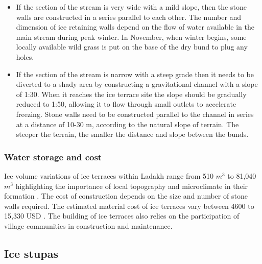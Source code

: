 \begin{itemize}

  \item If the section of the stream is very wide with a mild slope, then the stone walls are
    constructed in a series parallel to each other. The number and dimension of ice retaining walls depend on
    the flow of water available in the main stream during peak winter. In November, when winter begins, some
    locally available wild grass is put on the base of the dry bund to plug any holes.

  \item If the section of the stream is narrow with a steep grade then it needs to be diverted to a shady area
    by constructing a gravitational channel with a slope of 1:30. When it reaches the ice terrace site the slope
    should be gradually reduced to 1:50, allowing it to flow through small outlets to accelerate freezing. Stone
    walls need to be constructed parallel to the channel in series at a distance of 10-30 m, according to the
    natural slope of terrain. The steeper the terrain, the smaller the distance and slope between the bunds.

\end{itemize}


\subsubsection{Water storage and cost}

Ice volume variations of ice terraces within Ladakh  range from 510 $m^3$ to 81,040 $m^3$ highlighting
the importance of local topography and microclimate in their formation
\citep{nusserSociohydrologyArtificialGlaciers2019, norphelSnowWaterHarvesting2015}. The cost of construction
depends on the size and number of stone walls required. The estimated material cost of ice terraces vary between
4600 to 15,330 USD \citep{nusserSociohydrologyArtificialGlaciers2019}. The building of ice terraces also relies
on the participation of village communities in construction and maintenance. 


\subsection{Ice stupas}

